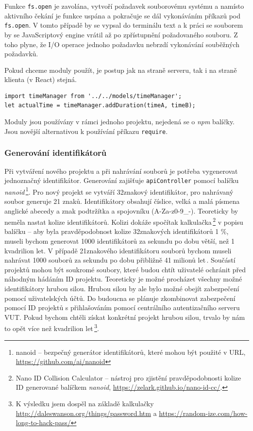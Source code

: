 Funkce \texttt{fs.open} je zavolána, vytvoří požadavek souborovému systému a namísto aktivního čekání je funkce uspána a pokračuje se dál vykonáváním příkazů pod \texttt{fs.open}. V tomto případě by se vypsal do terminálu text  a k práci se souborem by se JavaScriptový engine vrátil až po zpřístupnění požadovaného souboru. Z toho plyne, že I/O operace jednoho požadavku nebrzdí vykonávání souběžných požadavků.

Pokud chceme moduly použít, je postup jak na straně serveru, tak i na straně klienta (v React) stejná.
\begin{lstlisting}[style=JavaScript]
import timeManager from '../../models/timeManager';
let actualTime = timeManager.addDuration(timeA, timeB);
\end{lstlisting}

Moduly jsou používány v rámci jednoho projektu, nejedená se o \textit{npm} balíčky. Jsou novější alternativou k používání příkazu \texttt{require}.

\subsubsection{Generování identifikátorů}
Při vytváření nového projektu a při nahrávání souborů je potřeba vygenerovat jednoznačný identifikátor. Generování zajišťuje \texttt{apiController} pomocí balíčku \textit{nanoid}\,\footnote{nanoid -- bezpečný generátor identifikátorů, které mohou být použité v URL, \url{https://github.com/ai/nanoid}}. Pro nový projekt se vytváří 32znakový identifikátor, pro nahrávaný soubor generuje 21 znaků. Identifikátory obsahují číslice, velká a malá písmena anglické abecedy a znak podtržítka a spojovníku (A-Za-z0-9\_-). Teoreticky by neměla nastat kolize identifikátorů. Kolizi dokáže spočítak kalkulačka\,\footnote{Nano ID Collision Calculator -- nástroj pro zjistění pravděpodobnosti kolize ID generované balíčkem \textit{nanoid}, \url{https://zelark.github.io/nano-id-cc/}.} v popisu balíčku -- aby byla pravděpodobnost kolize 32znakových identifikátorů 1 \%, museli bychom generovat 1000 identifikátorů za sekundu po dobu větší, než 1 kvadrilion let. V případě 21znakového identifikátoru souborů bychom museli nahrávat 1000 souborů za sekundu po dobu přibližně 41 milionů let\,\cite{collision}. Součástí projektů mohou být soukromé soubory, které budou chtít uživatelé ochránit před náhodným hádáním ID projektu. Teoreticky je možné procházet všechny možné identifikátory hrubou silou. Hrubou silou by ale bylo možné obejít zabezpečení pomocí uživatelských účtů. Do budoucna se plánuje zkombinovat zabezpečení pomocí ID projektů s přihlašováním pomocí centrálního autentizačního serveru VUT. Pokud bychom chtěli získat konkrétní projekt hrubou silou, trvalo by nám to opět více než kvadrilion let\,\footnote{K výsledku jsem dospěl na základě kalkulačky \url{http://daleswanson.org/things/password.htm} a \url{https://random-ize.com/how-long-to-hack-pass/}}. 

